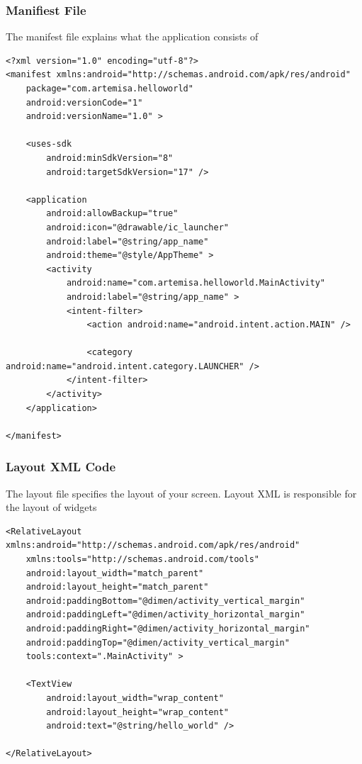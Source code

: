 \begin{frame}[fragile]
\frametitle{Manifiest File}
The manifest file explains what the application consists of
\lstset{language=XML, style=eclipse}
\begin{adjustbox}{width=0.8 \textwidth}
\begin{lstlisting}[caption=AndroidManifiest.xml]
<?xml version="1.0" encoding="utf-8"?>
<manifest xmlns:android="http://schemas.android.com/apk/res/android"
    package="com.artemisa.helloworld"
    android:versionCode="1"
    android:versionName="1.0" >

    <uses-sdk
        android:minSdkVersion="8"
        android:targetSdkVersion="17" />

    <application
        android:allowBackup="true"
        android:icon="@drawable/ic_launcher"
        android:label="@string/app_name"
        android:theme="@style/AppTheme" >
        <activity
            android:name="com.artemisa.helloworld.MainActivity"
            android:label="@string/app_name" >
            <intent-filter>
                <action android:name="android.intent.action.MAIN" />

                <category android:name="android.intent.category.LAUNCHER" />
            </intent-filter>
        </activity>
    </application>

</manifest>
\end{lstlisting}
\end{adjustbox}
\end{frame}
\begin{frame}[fragile]
\frametitle{Layout XML Code}
The layout file specifies the layout of your screen. Layout XML is responsible for the layout of widgets
\lstset{language=XML, style=eclipse}
\begin{adjustbox}{width=1.0 \textwidth}
\begin{lstlisting}[caption=res/layout/activity\_main.xml]
<RelativeLayout xmlns:android="http://schemas.android.com/apk/res/android"
    xmlns:tools="http://schemas.android.com/tools"
    android:layout_width="match_parent"
    android:layout_height="match_parent"
    android:paddingBottom="@dimen/activity_vertical_margin"
    android:paddingLeft="@dimen/activity_horizontal_margin"
    android:paddingRight="@dimen/activity_horizontal_margin"
    android:paddingTop="@dimen/activity_vertical_margin"
    tools:context=".MainActivity" >

    <TextView
        android:layout_width="wrap_content"
        android:layout_height="wrap_content"
        android:text="@string/hello_world" />

</RelativeLayout>
\end{lstlisting}
\end{adjustbox}
\end{frame}
